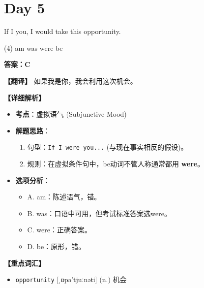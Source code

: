 \documentclass[11pt, a4paper]{article}
\newcommand{\analysis}[4]{
    \begin{solutionbox}
        \textbf{答案：#1}
        
        \textbf{【翻译】} #2
        
        \textbf{【详细解析】}
        #3
        
        \textbf{【重点词汇】}
        #4
    \end{solutionbox}
}
\newcommand{\blank}{\underline{\hspace{1.5cm}}}
\begin{document}
\section*{Day 5}
\begin{questions}
    \item If I \blank you, I would take this opportunity.
    \begin{tasks}(4)
        \task am \task was \task were \task be
    \end{tasks}
    \analysis{C}{如果我是你，我会利用这次机会。}{
        \begin{itemize}
            \item \textbf{考点}：虚拟语气 (Subjunctive Mood)
            \item \textbf{解题思路}：
                \begin{enumerate}
                    \item 句型：\texttt{If I were you...} (与现在事实相反的假设)。
                    \item 规则：在虚拟条件句中，be动词不管人称通常都用 \textbf{were}。
                \end{enumerate}
            \item \textbf{选项分析}：
                \begin{itemize}
                    \item A. am：陈述语气，错。
                    \item B. was：口语中可用，但考试标准答案选were。
                    \item C. were：正确答案。
                    \item D. be：原形，错。
                \end{itemize}
        \end{itemize}
    }{
        \begin{itemize}
            \item \texttt{opportunity} [ˌɒpə'tjuːnəti] (n.) 机会
        \end{itemize}
    }


\end{questions}
\end{document}
